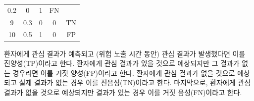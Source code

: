 \documentclass[10.5pt]{book}
\theoremstyle{definition}
\theoremstyle{definition}
\theoremstyle{definition}
\theoremstyle{remark}
\begin{document}
\begin{longtable}[]{@{}ccccc@{}}
\begin{minipage}[t]{0.14\columnwidth}
0.2\strut
\end{minipage} & \begin{minipage}[t]{0.14\columnwidth}\centering\strut
0\strut
\end{minipage} & \begin{minipage}[t]{0.14\columnwidth}\centering\strut
1\strut
\end{minipage} & \begin{minipage}[t]{0.11\columnwidth}\centering\strut
FN\strut
\end{minipage}\tabularnewline
\begin{minipage}[t]{0.12\columnwidth}\centering\strut
9\strut
\end{minipage} & \begin{minipage}[t]{0.14\columnwidth}\centering\strut
0.3\strut
\end{minipage} & \begin{minipage}[t]{0.14\columnwidth}\centering\strut
0\strut
\end{minipage} & \begin{minipage}[t]{0.14\columnwidth}\centering\strut
0\strut
\end{minipage} & \begin{minipage}[t]{0.11\columnwidth}\centering\strut
TN\strut
\end{minipage}\tabularnewline
\begin{minipage}[t]{0.12\columnwidth}\centering\strut
10\strut
\end{minipage} & \begin{minipage}[t]{0.14\columnwidth}\centering\strut
0.5\strut
\end{minipage} & \begin{minipage}[t]{0.14\columnwidth}\centering\strut
1\strut
\end{minipage} & \begin{minipage}[t]{0.14\columnwidth}\centering\strut
0\strut
\end{minipage} & \begin{minipage}[t]{0.11\columnwidth}\centering\strut
FP\strut
\end{minipage}\tabularnewline
\bottomrule
\end{longtable}

환자에게 관심 결과가 예측되고 (위험 노출 시간 동안) 관심 결과가
발생했다면 이를 진양성(TP)이라고 한다. 환자에게 관심 결과가 있을 것으로
예상되지만 그 결과가 없는 경우라면 이를 거짓 양성(FP)이라고 한다.
환자에게 관심 결과가 없을 것으로 예상되고 실제 결과가 없는 경우 이를
진음성(TN)이라고 한다. 마지막으로, 환자에게 관심 결과가 없을 것으로
예상되지만 결과가 있는 경우 이를 거짓 음성(FN)이라고
한다.  
\end{document}

